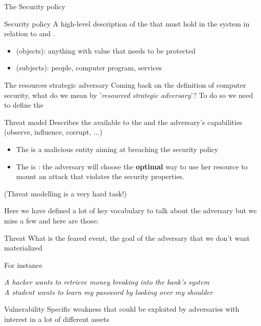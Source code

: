 \begin{parag}{The Security policy}
	\begin{definition}{Security policy}
    A high-level description of the  that must hold in the system in relation to  and .
    \end{definition}
	\begin{itemize}
	    \item {} (objects): anything with value that needs to be protected
	    \item {} (subjects): people, computer program, services
	\end{itemize}
\end{parag}
\begin{parag}{The resources strategic adversary}
    Coming back on the definition of computer security, what do we mean by '\textit{resourced strategic adversary}'? To do so we need to define the 
	\begin{definition}{Threat model}
	Describes the  available to the  and the adversary's capabilities (observe, influence, corrupt, ...)
	\end{definition}
	\begin{itemize}
	    \item The  is a malicious entity aiming at breaching the security policy
	    \item The  is : the adversary will choose the \textbf{optimal} way to use her resource to mount an attack that violates the security properties.
	\end{itemize}
	(Threat modelling is a very hard task!)
\end{parag}
Here we have defined a lot of key vocabulary to talk about the adversary but we miss a few and here are those:
\begin{definition}{Threat}
What is the feared event, the goal of the adversary that we don’t want materialized
\end{definition}
For instance 
\begin{center}
    \textit{A hacker wants to retrieve money breaking into the bank’s system\\ A student wants to learn my password by looking over my shoulder}
\end{center}

\begin{definition}{Vulnerability}
Specific weakness that could be exploited by adversaries with interest in a lot of different assets
\end{definition}

